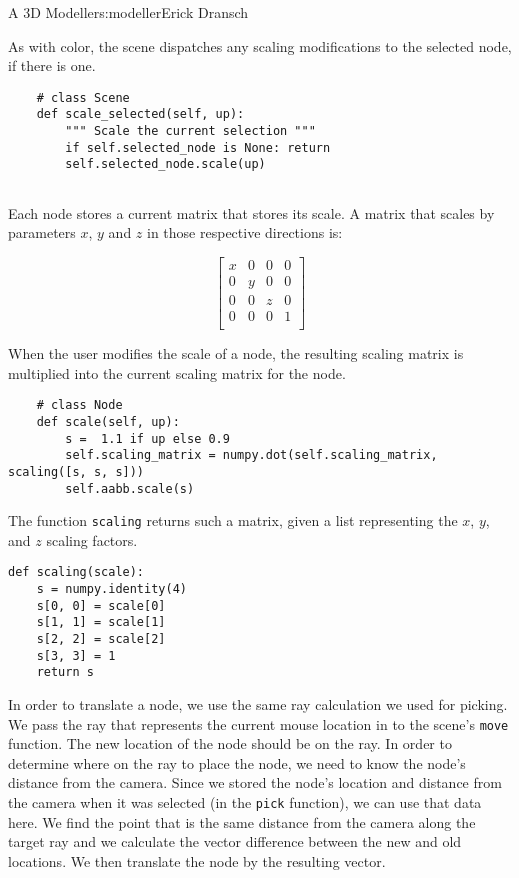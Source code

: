 \begin{aosachapter}{A 3D Modeller}{s:modeller}{Erick Dransch}
\label{scaling-nodes}

As with color, the scene dispatches any scaling modifications to the
selected node, if there is one.

\begin{verbatim}
    # class Scene
    def scale_selected(self, up):
        """ Scale the current selection """
        if self.selected_node is None: return
        self.selected_node.scale(up)
    
\end{verbatim}

Each node stores a current matrix that stores its scale. A matrix that
scales by parameters $x$, $y$ and $z$ in those respective directions is:

\[
   \begin{bmatrix}
   x & 0 & 0 & 0 \\
   0 & y & 0 & 0 \\
   0 & 0 & z & 0 \\
   0 & 0 & 0 & 1 \\
   \end{bmatrix}
\]

When the user modifies the scale of a node, the resulting scaling matrix
is multiplied into the current scaling matrix for the node.

\begin{verbatim}
    # class Node
    def scale(self, up):
        s =  1.1 if up else 0.9
        self.scaling_matrix = numpy.dot(self.scaling_matrix, scaling([s, s, s]))
        self.aabb.scale(s)
\end{verbatim}

The function \texttt{scaling} returns such a matrix, given a list
representing the $x$, $y$, and $z$ scaling factors.

\begin{verbatim}
def scaling(scale):
    s = numpy.identity(4)
    s[0, 0] = scale[0]
    s[1, 1] = scale[1]
    s[2, 2] = scale[2]
    s[3, 3] = 1
    return s
\end{verbatim}

\label{moving-nodes}

In order to translate a node, we use the same ray calculation we used
for picking. We pass the ray that represents the current mouse location
in to the scene's \texttt{move} function. The new location of the node
should be on the ray. In order to determine where on the ray to place
the node, we need to know the node's distance from the camera. Since we
stored the node's location and distance from the camera when it was
selected (in the \texttt{pick} function), we can use that data here. We
find the point that is the same distance from the camera along the
target ray and we calculate the vector difference between the new and
old locations. We then translate the node by the resulting vector.


\end{aosachapter}
